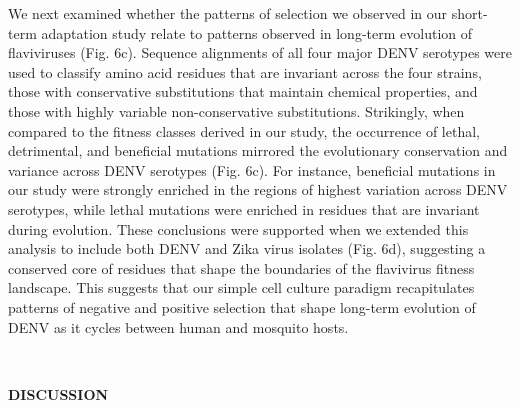 \documentclass[
]{article}
\begin{document}
We next examined whether the patterns of selection we observed in our
short-term adaptation study relate to patterns observed in long-term
evolution of flaviviruses (Fig. 6c). Sequence alignments of all four
major DENV serotypes were used to classify amino acid residues that are
invariant across the four strains, those with conservative substitutions
that maintain chemical properties, and those with highly variable
non-conservative substitutions. Strikingly, when compared to the fitness
classes derived in our study, the occurrence of lethal, detrimental, and
beneficial mutations mirrored the evolutionary conservation and variance
across DENV serotypes (Fig. 6c). For instance, beneficial mutations in
our study were strongly enriched in the regions of highest variation
across DENV serotypes, while lethal mutations were enriched in residues
that are invariant during evolution. These conclusions were supported
when we extended this analysis to include both DENV and Zika virus
isolates (Fig. 6d), suggesting a conserved core of residues that shape
the boundaries of the flavivirus fitness landscape. This suggests that
our simple cell culture paradigm recapitulates patterns of negative and
positive selection that shape long-term evolution of DENV as it cycles
between human and mosquito hosts.

~

\textbf{DISCUSSION}
\end{document}
